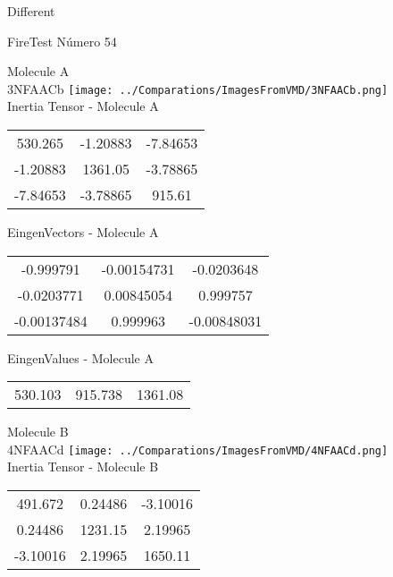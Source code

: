 \begin{center}
\vtab
\vtab
\textcolor{NavyBlue}{\Large Different}
\end{center}

 \newpage

\vtab[-2cm]
\begin{center}
{\large FireTest \tab Número 54}
\end{center}
\begin{multicols}{2}
\begin{center}

Molecule A \\ 
3NFAACb
\texttt{[image: ../Comparations/ImagesFromVMD/3NFAACb.png]}
\\
Inertia Tensor - Molecule A \\
\vtab

\begin{tabular}{|c c c|}
530.265	 & 	-1.20883	 & 	-7.84653	 \\
-1.20883	 & 	1361.05	 & 	-3.78865	 \\
-7.84653	 & 	-3.78865	 & 	915.61
\end{tabular}

\vtab
 EingenVectors - Molecule A     \\
\vtab
\begin{tabular}{|c c c|}
-0.999791	 & 	-0.00154731	 & 	-0.0203648	 \\
-0.0203771	 & 	0.00845054	 & 	0.999757	 \\
-0.00137484	 & 	0.999963	 & 	-0.00848031
\end{tabular}

\vtab
 EingenValues - Molecule A     \\
\vtab
\begin{tabular}{|c c c|}
530.103	 & 	915.738	 & 	1361.08	 \\
\end{tabular}
\columnbreak

Molecule B \\ 
4NFAACd
\texttt{[image: ../Comparations/ImagesFromVMD/4NFAACd.png]}
\\
Inertia Tensor - Molecule B \\
\vtab

\begin{tabular}{|c c c|}
491.672	 & 	0.24486	 & 	-3.10016	 \\
0.24486	 & 	1231.15	 & 	2.19965	 \\
-3.10016	 & 	2.19965	 & 	1650.11
\end{tabular}


\end{center}
\end{multicols}
